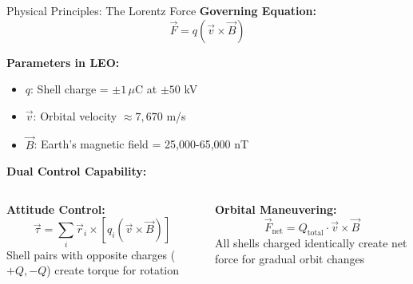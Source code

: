 \documentclass[aspectratio=169]{beamer}
\begin{document}
\begin{frame}{Physical Principles: The Lorentz Force}
\textbf{Governing Equation:}
\begin{equation}
\boxed{\vec{F} = q(\vec{v} \times \vec{B})}
\end{equation}

\textbf{Parameters in LEO:}
\begin{itemize}
    \item $q$: Shell charge = $\pm 1 \,\mu\text{C}$ at $\pm 50$ kV
    \item $\vec{v}$: Orbital velocity $\approx 7,670$ m/s
    \item $\vec{B}$: Earth's magnetic field = 25,000-65,000 nT
\end{itemize}

\vspace{0.3cm}
\textbf{Dual Control Capability:}

\begin{columns}
\textbf{Attitude Control:}
\begin{equation}
\vec{\tau} = \sum_i \vec{r}_i \times [q_i(\vec{v} \times \vec{B})]
\end{equation}
Shell pairs with opposite charges ($+Q, -Q$) create torque for rotation

\textbf{Orbital Maneuvering:}
\begin{equation}
\vec{F}_{\text{net}} = Q_{\text{total}} \cdot \vec{v} \times \vec{B}
\end{equation}
All shells charged identically create net force for gradual orbit changes
\end{columns}
\end{frame}
\end{document}
